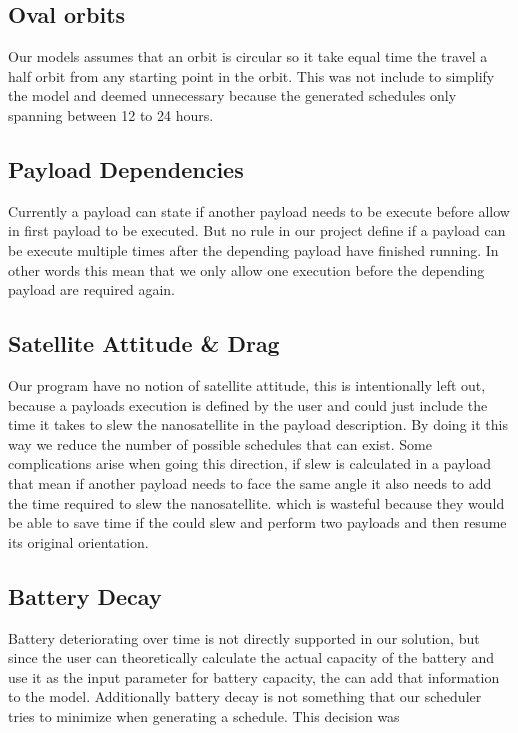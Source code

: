 \subsection{Oval orbits}
Our models assumes that an orbit is circular so it take equal time the travel a half orbit from any starting point in the orbit. This was not include to simplify the model and deemed unnecessary because the generated schedules only spanning between 12 to 24 hours. 

\subsection{Payload Dependencies}
Currently a payload can state if another payload needs to be execute before allow in first payload to be executed. But no rule in our project define if a payload can be execute multiple times after the depending payload have finished running. In other words this mean that we only allow one execution before the depending payload are required again.

\subsection{Satellite Attitude \& Drag}
Our program have no notion of satellite attitude, this is intentionally left out, because a payloads execution is defined by the user and could just include the time it takes to slew the nanosatellite in the payload description. By doing it this way we reduce the number of possible schedules that can exist. Some complications arise when going this direction, if slew is calculated in a payload that mean if another payload needs to face the same angle it also needs to add the time required to slew the nanosatellite. which is wasteful because they would be able to save time if the could slew and perform two payloads and then resume its original orientation.

\subsection{Battery Decay}
Battery deteriorating over time is not directly supported in our solution, but since the user can theoretically calculate the actual capacity of the battery and use it as the input parameter for battery capacity, the can add that information to the model. Additionally battery decay is not something that our scheduler tries to minimize when generating a schedule. This decision was

